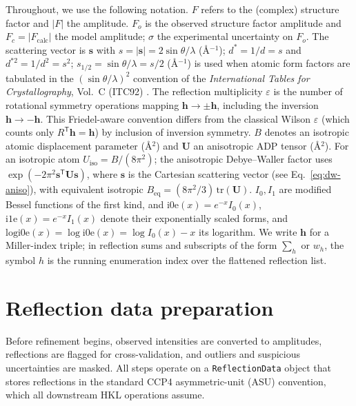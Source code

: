 \documentclass{iucrjournals}
\begin{document}
Throughout, we use the following notation.
$F$ refers to the (complex) structure factor and $|F|$ the amplitude.
$F_{o}$ is the observed structure factor amplitude and
$F_{c} = |F_\mathrm{calc}|$ the model amplitude; $\sigma$ the experimental
uncertainty on $F_{o}$.
The scattering vector is $\mathbf{s}$ with
$s = |\mathbf{s}| = 2\sin\theta/\lambda$ (\AA$^{-1}$);
$d^\ast = 1/d = s$ and $d^{\ast 2}=1/d^2=s^2$;
$s_{1/2} = \sin\theta/\lambda = s/2$ (\AA$^{-1}$) is used when atomic form
factors are tabulated in the $(\sin\theta/\lambda)^{2}$ convention of the
\emph{International Tables for Crystallography}, Vol.~C (ITC92)
\cite{wilson_international_1992}.
The reflection multiplicity $\varepsilon$ is the number of rotational
symmetry operations mapping $\mathbf{h} \rightarrow \pm\mathbf{h}$,
including the inversion $\mathbf{h} \rightarrow -\mathbf{h}$.
This Friedel-aware convention differs from the classical Wilson
$\varepsilon$ (which counts only $R^{\mathsf{T}}\mathbf{h} = \mathbf{h}$) by
inclusion of inversion symmetry.
$B$ denotes an isotropic atomic displacement parameter (\AA$^{2}$) and
$\mathbf{U}$ an anisotropic ADP tensor (\AA$^{2}$).
For an isotropic atom $U_\mathrm{iso} = B/(8\pi^{2})$; the anisotropic
Debye--Waller factor uses
$\exp(-2\pi^{2}\mathbf{s}^{\mathsf{T}}\mathbf{U}\mathbf{s})$, where $\mathbf{s}$
is the Cartesian scattering vector (see Eq.~\ref{eq:dw-aniso}), with equivalent
isotropic $B_\mathrm{eq} = (8\pi^{2}/3)\,\mathrm{tr}(\mathbf{U})$.
$I_{0}, I_{1}$ are modified Bessel functions of the first kind, and
$\mathrm{i0e}(x) = e^{-x}I_{0}(x)$, $\mathrm{i1e}(x) = e^{-x}I_{1}(x)$ denote
their exponentially scaled forms, and
$\mathrm{logi0e}(x) = \log\mathrm{i0e}(x) = \log I_{0}(x) - x$ its logarithm.
We write $\mathbf{h}$ for a Miller-index triple; in reflection sums and
subscripts of the form $\sum_{h}$ or $w_{h}$, the symbol $h$ is the running
enumeration index over the flattened reflection list.

\section{Reflection data preparation}

Before refinement begins, observed intensities are converted to amplitudes,
reflections are flagged for cross-validation, and outliers and suspicious
uncertainties are masked.  All steps operate on a \texttt{ReflectionData}
object that stores reflections in the standard CCP4 asymmetric-unit (ASU)
convention, which all downstream HKL operations assume.
\end{document}

